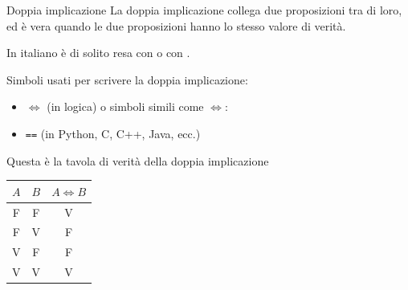 \documentclass[aspectratio=169,10pt,dvipsnames,handout]{beamer}
\begin{document}
\begin{frame}{Doppia implicazione}
    La \alert{doppia implicazione} collega due proposizioni tra di loro, ed è vera quando le due proposizioni hanno lo stesso valore di verità.

    \medskip
    In italiano è di solito resa con  o con .

    \medskip
    Simboli usati per scrivere la doppia implicazione:
    \begin{itemize}
        \item \alert{$\iff$ (in logica)} o simboli simili come $\Leftrightarrow$:
        \item \alert{\texttt{==} (in Python, C, C++, Java, ecc.)}
    \end{itemize}

    \pause
    \medskip
    Questa è la tavola di verità della doppia implicazione

    \medskip
    \begin{center}
        \begin{tabular}{c|c||c}
            $A$ & $B$ & $A \iff B$ \\
            \hline
            F   & F   & V          \\
            F   & V   & F          \\
            V   & F   & F          \\
            V   & V   & V
        \end{tabular}
    \end{center}
\end{frame}
\end{document}

